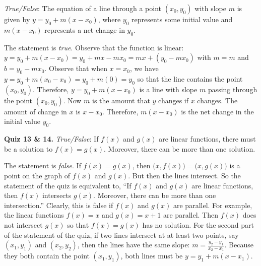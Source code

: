 \documentclass[11pt,letterpaper]{article}
\begin{document}
\quizsol \textit{True/False}: The equation of a line through a point $(x_0, y_0)$ with slope $m$ is given by $y= y_0 + m(x - x_0)$, where $y_0$ represents some initial value and $m(x - x_0)$ represents a net change in $y_0$. \pspace

\sol The statement is \textit{true}. Observe that the function is linear: $y= y_0 + m(x - x_0)= y_0 + mx - mx_0= mx + (y_0 - mx_0)$ with $m= m$ and $b= y_0 - mx_0$. Observe that when $x= x_0$, we have $y= y_0 + m(x_0 - x_0)= y_0 + m(0)= y_0$ so that the line contains the point $(x_0 , y_0)$. Therefore, $y= y_0 + m(x - x_0)$ is a line with slope $m$ passing through the point $(x_0, y_0)$. Now $m$ is the amount that $y$ changes if $x$ changes. The amount of change in $x$ is $x - x_0$. Therefore, $m(x - x_0)$ is the net change in the initial value $y_0$. \pvspace{1.5cm}



\noindent\textbf{Quiz 13 \& 14.} \textit{True/False}: If $f(x)$ and $g(x)$ are linear functions, there must be a solution to $f(x)= g(x)$. Moreover, there can be more than one solution. \phantom{\quizsol\quizsol} \pspace

\sol The statement is \textit{false}. If $f(x)= g(x)$, then $\big(x, f(x) \big)= \big(x, g(x) \big)$ is a point on the graph of $f(x)$ and $g(x)$. But then the lines intersect. So the statement of the quiz is equivalent to, ``If $f(x)$ and $g(x)$ are linear functions, then $f(x)$ intersects $g(x)$. Moreover, there can be more than one intersection.'' Clearly, this is false if $f(x)$ and $g(x)$ are parallel. For example, the linear functions $f(x)= x$ and $g(x)= x + 1$ are parallel. Then $f(x)$ does not intersect $g(x)$ so that $f(x)= g(x)$ has no solution. For the second part of the statement of the quiz, if two lines intersect at at least two points, say $(x_1, y_1)$ and $(x_2, y_2)$, then the lines have the same slope: $m= \frac{y_2 - y_1}{x_2 - x_1}$. Because they both contain the point $(x_1, y_1)$, both lines must be $y= y_1 + m(x - x_1)$. 





\end{document}
